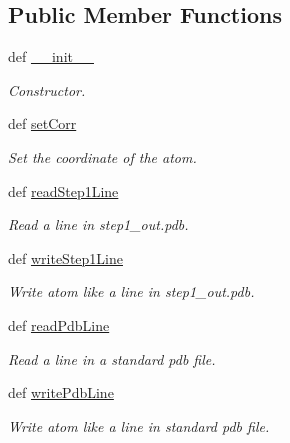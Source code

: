 \subsection*{Public Member Functions}
\begin{DoxyCompactItemize}
\item 
def \hyperlink{classxmccepy_1_1atom_1_1_atom_a1964c39c0d09b6867c35ad3ad95c4f06}{\-\_\-\-\_\-init\-\_\-\-\_\-}
\begin{DoxyCompactList}\small\item\em Constructor. \end{DoxyCompactList}\item 
def \hyperlink{classxmccepy_1_1atom_1_1_atom_ae2e395a615e79abe1dd1c5f0ce3d0c90}{set\-Corr}
\begin{DoxyCompactList}\small\item\em Set the coordinate of the atom. \end{DoxyCompactList}\item 
def \hyperlink{classxmccepy_1_1atom_1_1_atom_af43673725714087009243eadbc7f95a7}{read\-Step1\-Line}
\begin{DoxyCompactList}\small\item\em Read a line in step1\-\_\-out.\-pdb. \end{DoxyCompactList}\item 
def \hyperlink{classxmccepy_1_1atom_1_1_atom_a5f3516b8720c26ba0712f7b6066c1cf4}{write\-Step1\-Line}
\begin{DoxyCompactList}\small\item\em Write atom like a line in step1\-\_\-out.\-pdb. \end{DoxyCompactList}\item 
def \hyperlink{classxmccepy_1_1atom_1_1_atom_a36929050f7e6a8728a3525a3eb58b044}{read\-Pdb\-Line}
\begin{DoxyCompactList}\small\item\em Read a line in a standard pdb file. \end{DoxyCompactList}\item 
def \hyperlink{classxmccepy_1_1atom_1_1_atom_a19708571103d9d925eaa23d07a7963d8}{write\-Pdb\-Line}
\begin{DoxyCompactList}\small\item\em Write atom like a line in standard pdb file. \end{DoxyCompactList}\end{DoxyCompactItemize}
